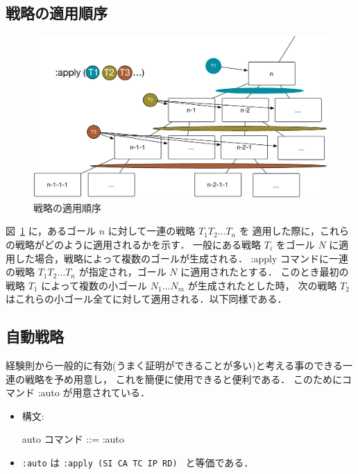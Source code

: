 \documentclass[a4paper,oneside,10pt,here]{memoir}
\newenvironment{vvtm}%
{\parskip=0pt\lineskip=0pt\begin{center}\begin{minipage}{0.8\textwidth}\begin{snugshade}}%
  {\end{snugshade}\end{minipage}\end{center}}
\begin{document}
\subsection{戦略の適用順序}\label{sec:order-of-tatic-application}

\begin{figure}[htbp]
\begin{center}
  \includegraphics[scale=0.4]{apply-order.pdf}
\end{center}
\caption{戦略の適用順序}
\label{fig:apply-tactic}
\end{figure}
図~\ref{fig:apply-tactic} に，あるゴール $n$ に対して一連の戦略 $T_1 T_2 \ldots T_n$ を
適用した際に，これらの戦略がどのように適用されるかを示す．
一般にある戦略 $T_i$ をゴール $N$ に適用した場合，戦略によって複数のゴールが生成される．
:apply コマンドに一連の戦略 $T_1 T_2 \ldots T_n$ が指定され，ゴール $N$ に適用されたとする．
このとき最初の戦略 $T_1$ によって複数の小ゴール $N_1 \ldots N_m$ が生成されたとした時，
次の戦略 $T_2$ はこれらの小ゴール全てに対して適用される．以下同様である．

\subsection{自動戦略} \label{sec:tactic-auto}
経験則から一般的に有効(うまく証明ができることが多い)と考える事のできる一連の戦略を予め用意し，
これを簡便に使用できると便利である．
このためにコマンド :auto が用意されている．

\begin{itemize}
\item 構文:
  \begin{vvtm}
    \begin{simplev}
  auto コマンド ::= :auto      
    \end{simplev}
  \end{vvtm}
\item \verb|:auto| は \verb|:apply (SI CA TC IP RD) | と等価である．
\end{itemize}
\end{document}
